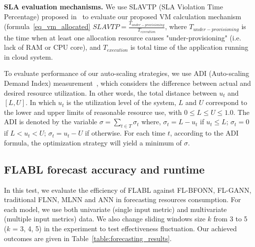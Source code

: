 \documentclass[runningheads]{llncs}
\begin{document}
\textbf{SLA evaluation mechanisms.} We use SLAVTP (SLA Violation Time Percentage) proposed in~\cite{ref_dang} to evaluate our proposed VM calculation mechanism (formula~\ref{eq_vm_allocated} 
	$ SLAVTP = \frac{T_{under-provisioning}}{T_{execution}}$, where 
	$T_{under-provisioning}$ is the time when at least one allocation resource causes "under-provisioning" (i.e. lack of RAM or CPU core), and 
	$T_{execution}$ is total time of the application running in cloud system. 

To evaluate performance of our auto-scaling strategies, we use ADI (Auto-scaling Demand Index) measurement~\cite{ref_netto}, 
which considers the difference between actual and desired resource utilization. In other words, the total distance between $u_t$ and $[L, U]$. In which $u_t$ is the utilization level of the system, $L$ and $U$ correspond to the lower and upper limits of reasonable resource use, with $0 \le L \le U \le 1.0$. The ADI is denoted by the variable $\sigma = \sum_{t \in T}{\sigma_t}$ where, $\sigma_t = L - u_t$ if $u_t \le L$; $\sigma_t = 0$ if $L < u_t <U$; $\sigma_t = u_t -U$ if otherwise. For each time $t$, according to the ADI formula, the optimization strategy will yield a minimum of $\sigma$. 

\subsection{FLABL forecast accuracy and runtime}
\label{predicting_results}

In this test, we evaluate the efficiency of FLABL against FL-BFONN, FL-GANN, traditional FLNN, MLNN and ANN in forecasting resources consumption. For each model, we use both univariate (single input metric) and multivariate (multiple input metrics) data. We also change sliding windows size $k$ from 3 to 5 ($k$ = 3, 4, 5) in the experiment to test effectiveness fluctuation. Our achieved outcomes are given in Table~\ref{table:forecasting_results}.
\end{document}
